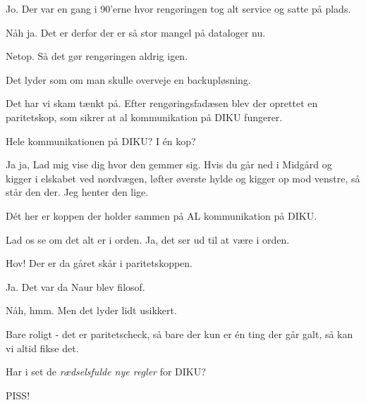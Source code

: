 \documentclass[a4paper,11pt]{article}
\newcommand{\hide}[1]{}
\begin{document}
\begin{sketch}
 Jo. Der var en gang i 90'erne hvor rengøringen tog alt service og satte på plads.

 Nåh ja. Det er derfor der er så stor mangel på dataloger nu.

 Netop. Så det gør rengøringen aldrig igen.

 Det lyder som om man skulle overveje en backupløsning.

 Det har vi skam tænkt på. Efter rengøringsfadæsen blev der oprettet en paritetskop, som sikrer at al 
kommunikation på DIKU fungerer.

 Hele kommunikationen på DIKU? I én kop?

 Ja ja, Lad mig vise dig hvor den gemmer sig. Hvis du går ned i Midgård og kigger i elskabet 
ved nordvægen, løfter øverste hylde og kigger op mod venstre, så står den der.  Jeg henter den lige.



 Dét her er koppen der holder sammen på AL kommunikation på DIKU.

 Lad os se om det alt er i orden.  Ja, det ser ud til at være i orden.

  Hov! Der er da gåret skår i paritetskoppen.

 Ja. Det var da Naur blev filosof.

 Nåh, hmm. Men det lyder lidt usikkert.

 Bare roligt - det er paritetscheck, så bare der kun er én ting
der går galt, så kan vi altid fikse det.
\hide{
Begin Alt-slutning

\scene{Fuld mand kommer væltende ind og tramper godt rundt i servicen
  - vælter ud igen}

\says{FM} Hey, skal i ikke med på Cafen? 

\says{S1+S2} PISS!

\scene{TFH}

Alternativ slutning 2
}

 Har i set de \emph{rædselsfulde nye regler} for DIKU?


 PISS!

\end{sketch}
\end{document}
